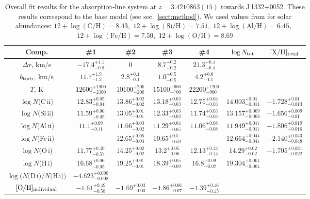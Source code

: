\documentclass[fleqn,usenatbib]{mnras}
\newcommand{\DI}[0]{D\,{\sc i}}
\newcommand{\HI}[0]{H\,{\sc i}}
\newcommand{\OI}[0]{O\,{\sc i}}
\newcommand{\CII}[0]{C\,{\sc ii}}
\newcommand{\SiII}[0]{Si\,{\sc ii}}
\newcommand{\AlII}[0]{Al\,{\sc ii}}
\newcommand{\FeII}[0]{Fe\,{\sc ii}}
\newcommand{\q}{J\,1332$+$0052}
\begin{document}
\begin{table}
\begin{tabular}{ccccccc}
\hline
\hline
Comp. & \#1 & \#2 & \#3 & \#4 & $\log N_{\rm tot}$ & $\rm [X/H]_{total}$ \\
\hline
$\Delta$v, km/s & $-17.4^{+1.1}_{-0.8}$ & $0$ & $8.7^{+0.2}_{-0.2}$ & $21.3^{+0.4}_{-0.4}$ & & \\$b_{\rm turb}$, km/s & $11.7^{+1.9}_{-1.2}$ & $2.8^{+0.1}_{-0.1}$ & $1.0^{+0.5}_{-0.5}$ & $4.2^{+0.8}_{-1.1}$ & & \\ 
$T$, K & $12600^{+1900}_{-2300}$ & $10100^{+200}_{-200}$ & $15100^{+900}_{-700}$ & $22200^{+1200}_{-900}$ & & \\ 
$\log N$(\CII) & $12.83^{+0.05}_{-0.04}$ & $13.86^{+0.02}_{-0.02}$ & $13.18^{+0.03}_{-0.03}$ & $12.75^{+0.04}_{-0.03}$ & $14.003^{+0.01}_{-0.011}$ & $-1.728^{+0.01}_{-0.013}$\\ 
$\log N$(\SiII) & $11.59^{+0.06}_{-0.05}$ & $13.05^{+0.01}_{-0.01}$ & $12.33^{+0.03}_{-0.03}$ & $11.74^{+0.03}_{-0.03}$ & $13.157^{+0.009}_{-0.008}$ & $-1.656^{+0.009}_{-0.01}$ \\ 
$\log N$(\AlII) & $11.1^{+0.09}_{-0.11}$ & $11.66^{+0.03}_{-0.02}$ & $11.29^{+0.04}_{-0.05}$ & $11.06^{+0.08}_{-0.08}$ & $11.949^{+0.017}_{-0.017}$ & $-1.806^{+0.019}_{-0.016}$ \\ 
$\log N$(\FeII) &  & $12.65^{+0.05}_{-0.04}$ & $10.65^{+0.5}_{-0.59}$ & & $12.664^{+0.044}_{-0.047}$ & $-2.140^{+0.043}_{-0.048}$ \\ 
$\log N$(\OI) & $11.77^{+0.49}_{-0.57}$ & $14.25^{+0.02}_{-0.02}$ & $13.2^{+0.05}_{-0.06}$ & $12.13^{+0.13}_{-0.14}$ & $14.29^{+0.02}_{-0.02}$ & $-1.705^{+0.021}_{-0.022}$ \\ 
$\log N$(\HI) & $16.68^{+0.06}_{-0.05}$ & $19.25^{+0.01}_{-0.01}$ & $18.39^{+0.05}_{-0.09}$ & $16.8^{+0.09}_{-0.07}$ & $19.304^{+0.004}_{-0.004}$ & \\ 
\hline 
$\log (N($\DI$)/N($\HI$))$ & $-4.623^{+0.008}_{-0.008}$ &  &  &  &  & \\ 
\hline 
 $\rm[O/H]_{individual}$ & $-1.61^{+0.49}_{-0.58}$ & $-1.69^{+0.03}_{-0.03}$ & $-1.86^{+0.06}_{-0.07}$ & $-1.39^{+0.16}_{-0.15}$ &  & \\
\end{tabular}
\caption{Overall fit results for the absorption-line system at $z=3.4210863(15)$ towards \q. These results correspond to the base model
(see sec.~\ref{sect:method}). We used values from \protect\cite{Asplund_2009} 
for solar abundances: $12 + \log(\text{C/H}) = 8.43$,\ $12 + \log(\text{Si/H}) = 7.51$,\ $12 + \log(\text{Al/H}) = 6.45$,\ $12 + \log(\text{Fe/H}) = 7.50$,\ $12 + \log(\text{O/H}) = 8.69$
}
\label{tab:fit_results}
\end{table}
\end{document}

